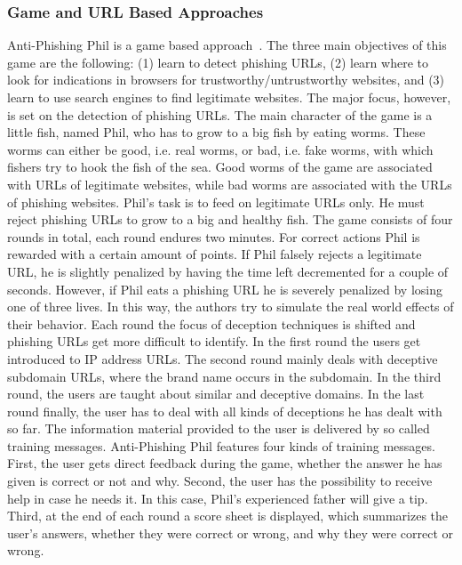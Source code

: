 \subsubsection{Game and URL Based Approaches}
Anti-Phishing Phil is a game based approach~\cite{sheng2007antiphishingphil}. 
The three main objectives of this game are the following: 
(1) learn to detect phishing URLs, (2) learn where to look for indications in browsers for trustworthy/untrustworthy websites, and (3) learn to use search engines to find legitimate websites. 
The major focus, however, is set on the detection of phishing URLs. 
The main character of the game is a little fish, named Phil, who has to grow to a big fish by eating worms. 
These worms can either be good, i.e. real worms, or bad, i.e. fake worms, with which fishers try to hook the fish of the sea. 
Good worms of the game are associated with URLs of legitimate websites, while bad worms are associated with the URLs of phishing websites. 
Phil's task is to feed on legitimate URLs only. 
He must reject phishing URLs to grow to a big and healthy fish. 
The game consists of four rounds in total, each round endures two minutes. 
For correct actions Phil is rewarded with a certain amount of points. 
If Phil falsely rejects a legitimate URL, he is slightly penalized by having the time left decremented for a couple of seconds. 
However, if Phil eats a phishing URL he is severely penalized by losing one of three lives. 
In this way, the authors try to simulate the real world effects of their behavior. 
Each round the focus of deception techniques is shifted and phishing URLs get more difficult to identify. 
In the first round the users get introduced to IP address URLs. 
The second round mainly deals with deceptive subdomain URLs, where the brand name occurs in the subdomain. 
In the third round, the users are taught about similar and deceptive domains. 
In the last round finally, the user has to deal with all kinds of deceptions he has dealt with so far. 
The information material provided to the user is delivered by so called training messages. 
Anti-Phishing Phil features four kinds of training messages. 
First, the user gets direct feedback during the game, whether the answer he has given is correct or not and why. 
Second, the user has the possibility to receive help in case he needs it. 
In this case, Phil's experienced father will give a tip. 
Third, at the end of each round a score sheet is displayed, which summarizes the user's answers, whether they were correct or wrong, and why they were correct or wrong. 
